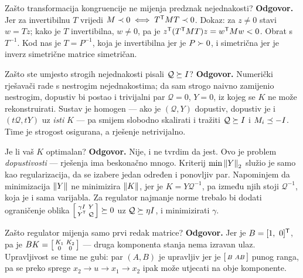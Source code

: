 \begin{pitanje}{Zašto transformacija kongruencije ne mijenja predznak nejednakosti?}
\textbf{Odgovor.} Jer za invertibilnu $T$ vrijedi $M \prec 0 \iff T^{\mathsf{T}} M T \prec 0$.
Dokaz: za $z \neq 0$ stavi $w = Tz$; kako je $T$ invertibilna, $w \neq 0$, pa je
$z^{\mathsf{T}}(T^{\mathsf{T}} M T)z = w^{\mathsf{T}} M w < 0$. Obrat s $T^{-1}$. Kod nas je
$T = P^{-1}$, koja je invertibilna jer je $P \succ 0$, i simetrična jer je inverz
simetrične matrice simetričan.
\end{pitanje}

\begin{pitanje}{Zašto ste umjesto strogih nejednakosti pisali $\mathcal{Q} \succeq I$?}
\textbf{Odgovor.} Numerički rješavači rade s nestrogim nejednakostima; da sam
strogo naivno zamijenio nestrogim, dopustiv bi postao i trivijalni par
$\mathcal{Q} = 0$, $Y = 0$, iz kojeg se $K$ ne može rekonstruirati. Sustav je
homogen --- ako je $(\mathcal{Q}, Y)$ dopustiv, dopustiv je i
$(t\mathcal{Q}, tY)$ uz \emph{isti} $K$ --- pa smijem slobodno skalirati i tražiti
$\mathcal{Q} \succeq I$ i $M_i \preceq -I$. Time je strogost osigurana, a rješenje
netrivijalno.
\end{pitanje}

\begin{pitanje}{Je li vaš $K$ optimalan?}
\textbf{Odgovor.} Nije, i ne tvrdim da jest. Ovo je problem \emph{dopustivosti} ---
rješenja ima beskonačno mnogo. Kriterij $\min\left\lVert Y \right\rVert_2$ služio je samo kao
regularizacija, da se izabere jedan određen i ponovljiv par. Napominjem da
minimizacija $\left\lVert Y \right\rVert$ ne minimizira $\left\lVert K \right\rVert$, jer je $K = Y\mathcal{Q}^{-1}$,
pa između njih stoji $\mathcal{Q}^{-1}$, koja je i sama varijabla. Za regulator
najmanje norme trebalo bi dodati ograničenje oblika
$\begin{bsmallmatrix} \gamma I & Y \\ Y^{\mathsf{T}} & \mathcal{Q}\end{bsmallmatrix} \succeq 0$
uz $\mathcal{Q} \succeq \eta I$, i minimizirati $\gamma$.
\end{pitanje}

\begin{pitanje}{Zašto regulator mijenja samo prvi redak matrice?}
\textbf{Odgovor.} Jer je $B = [1,\ 0]\trans$, pa je
$BK = \begin{bsmallmatrix} K_1 & K_2 \\ 0 & 0\end{bsmallmatrix}$ --- druga
komponenta stanja nema izravan ulaz. Upravljivost se time ne gubi: par $(A, B)$
je upravljiv jer je $\begin{bsmallmatrix} B & AB \end{bsmallmatrix}$ punog ranga,
pa se preko sprege $x_2 \to u \to x_1 \to x_2$ ipak može utjecati na obje
komponente.
\end{pitanje}

